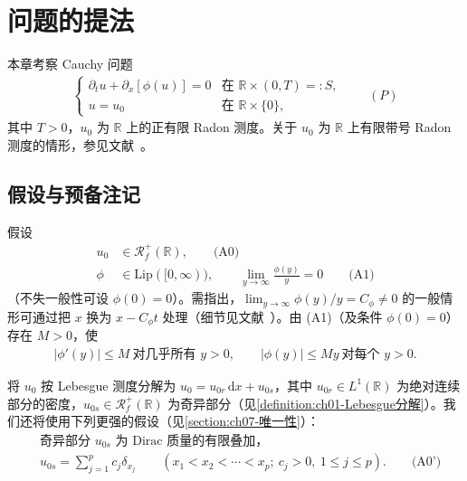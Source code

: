 ﻿\documentclass[../../main.tex]{subfiles}%
\begin{document}
\section{问题的提法}\label{section:ch07-问题提法}

本章考察 Cauchy 问题
\begin{align*}
\begin{cases}
\partial_t u+\partial_x[\phi(u)]=0 & \text{在 }\mathbb{R}\times(0,T)=:S,\\
u=u_0 & \text{在 }\mathbb{R}\times\{0\},
\end{cases}
\qquad(P)
\end{align*}
其中 $T>0$，$u_0$ 为 $\mathbb{R}$ 上的正有限 Radon 测度。关于 $u_0$ 为 $\mathbb{R}$ 上有限带号 Radon 测度的情形，参见文献~\cite{ref19}。

\subsection{假设与预备注记}\label{subsection:ch07-假设}

假设
\begin{align*}
u_0&\in\mathscr{R}_f^+(\mathbb{R}), \qquad\text{(A0)}\\
\phi&\in\mathrm{Lip}([0,\infty)),\qquad \lim_{y\to\infty}\frac{\phi(y)}{y}=0 \qquad\text{(A1)}
\end{align*}
（不失一般性可设 $\phi(0)=0$）。需指出，$\lim_{y\to\infty}\phi(y)/y=C_\phi\neq0$ 的一般情形可通过把 $x$ 换为 $x-C_\phi t$ 处理（细节见文献~\cite{ref18}）。由 (A1)（及条件 $\phi(0)=0$）存在 $M>0$，使
\begin{align}
|\phi'(y)|\leqslant M\ \text{对几乎所有 }y>0,\qquad |\phi(y)|\leqslant My\ \text{对每个 }y>0. \label{align:ch07-7.1}
\end{align}

将 $u_0$ 按 Lebesgue 测度分解为 $u_0=u_{0r}\,\mathrm{d}x+u_{0s}$，其中 $u_{0r}\in L^1(\mathbb{R})$ 为绝对连续部分的密度，$u_{0s}\in\mathscr{R}_f^+(\mathbb{R})$ 为奇异部分（见\cref{definition:ch01-Lebesgue分解}）。我们还将使用下列更强的假设（见\cref{section:ch07-唯一性}）：
\begin{align*}
&\text{奇异部分 }u_{0s}\text{ 为 Dirac 质量的有限叠加，}\\
&u_{0s}=\sum_{j=1}^p c_j\delta_{x_j}\qquad(x_1<x_2<\cdots<x_p;\ c_j>0,\ 1\leqslant j\leqslant p). \qquad\text{(A0')}
\end{align*}
\end{document}
